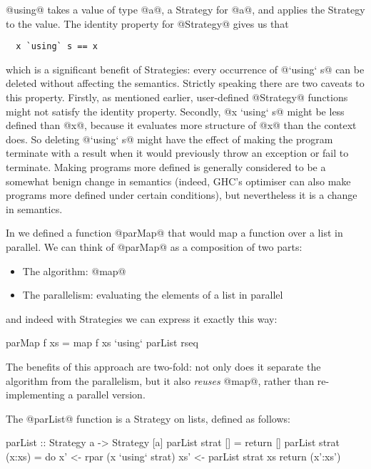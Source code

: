 \noindent @using@ takes a value of type @a@, a Strategy for @a@, and
applies the Strategy to the value.  The identity property for
@Strategy@ gives us that

{\small \begin{verbatim}
  x `using` s == x
\end{verbatim}}

\noindent which is a significant benefit of Strategies: every
occurrence of @`using` s@ can be deleted without affecting the
semantics.  Strictly speaking there are two caveats to this property.
Firstly, as mentioned earlier, user-defined @Strategy@ functions might
not satisfy the identity property.  Secondly, @x `using` s@ might be
less defined than @x@, because it evaluates more structure of @x@ than
the context does.  So deleting @`using` s@ might have the effect of
making the program terminate with a result when it would previously
throw an exception or fail to terminate.  Making programs more defined
is generally considered to be a somewhat benign change in semantics
(indeed, GHC's optimiser can also make programs more defined under
certain conditions), but nevertheless it is a change in semantics.


In  we defined a function @parMap@ that would map a
function over a list in parallel.  We can think of @parMap@ as a
composition of two parts:

\begin{itemize}
\item The algorithm: @map@
\item The parallelism: evaluating the elements of a list in parallel
\end{itemize}

\noindent and indeed with Strategies we can express it exactly this
way:

\begin{haskell}
parMap f xs = map f xs `using` parList rseq
\end{haskell}

\noindent The benefits of this approach are two-fold: not only does it
separate the algorithm from the parallelism, but it also \emph{reuses}
@map@, rather than re-implementing a parallel version.

The @parList@ function is a Strategy on lists, defined as follows:

\begin{haskell}
parList :: Strategy a -> Strategy [a]
parList strat []     = return []
parList strat (x:xs) = do
  x'  <- rpar (x `using` strat)
  xs' <- parList strat xs
  return (x':xs')
\end{haskell}

